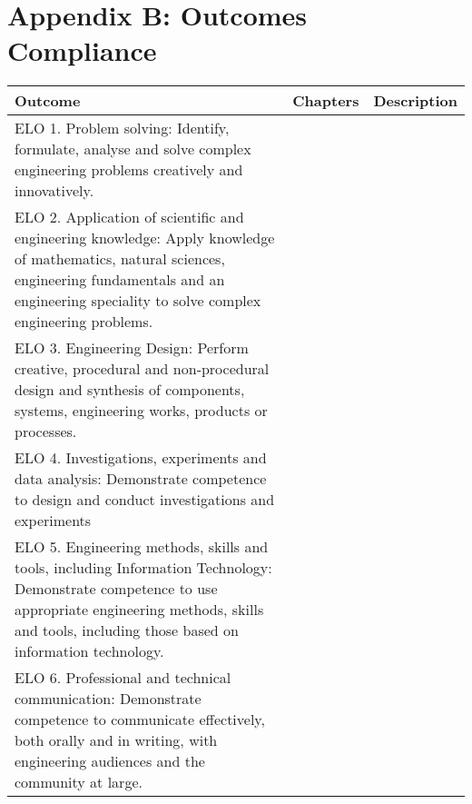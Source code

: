 \setcounter{table}{0}
\renewcommand{\thetable}{B.\arabic{table}}

\vspace{-1cm}

\chapter{Appendix B: Outcomes Compliance}

\vspace{-1cm}

    
 \begin{table}[H]
  \begin{center}
    \begin{tabular}{ | p{8cm} | l | p{5cm} |}
    \hline
    
    Outcome & Chapters & Description \\ \hline \hline
    
    ELO 1. Problem solving: Identify, formulate, analyse and solve complex engineering problems creatively and innovatively. &  &  \\ \hline
    
    
    ELO 2. Application of scientific and engineering knowledge: Apply knowledge of mathematics, natural sciences,
engineering fundamentals and an engineering speciality to solve complex engineering problems. &  &  \\ \hline
    
    
    ELO 3. Engineering Design: Perform creative, procedural and non‐procedural design and synthesis of components, systems, engineering works, products or processes. &  &  \\  \hline



    ELO 4. Investigations, experiments and data analysis: Demonstrate competence to design and conduct investigations and experiments &  &  \\  \hline


    ELO 5. Engineering methods, skills and tools, including Information Technology: Demonstrate competence to use
appropriate engineering methods, skills and tools, including those based on information technology. &  &  \\  \hline



   ELO 6. Professional and technical communication: Demonstrate competence to communicate effectively, both orally and
in writing, with engineering audiences and the community at large. &  &  \\  \hline





\end{tabular}
\end{center}
\end{table}
